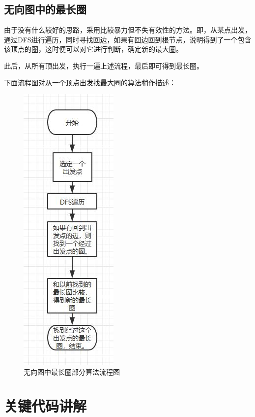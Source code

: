 \documentclass[UTF8]{article}
\begin{document}
	\subsection{无向图中的最长圈}
	由于没有什么较好的思路，采用比较暴力但不失有效性的方法。即，从某点出发，通过DFS进行遍历，同时寻找回边，如果有回边回到根节点，说明得到了一个包含该顶点的圈，这时便可以对它进行判断，确定新的最大圈。\par
	此后，从所有顶出发，执行一遍上述流程，最后即可得到最长圈。\par
	下面流程图对从一个顶点出发找最大圈的算法稍作描述：\par
	\begin{figure}[H]
		\centering
		\includegraphics[scale=0.5]{process_4.jpg}
		\caption{无向图中最长圈部分算法流程图}
		\label{process_4}
	\end{figure}

	
	\section{关键代码讲解}
\end{document}
